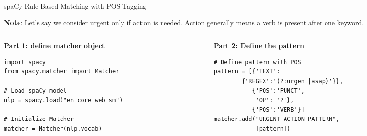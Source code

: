 \documentclass{beamer}
\begin{document}
\begin{frame}[fragile]{spaCy Rule-Based Matching with POS Tagging}

\textbf{Note}: Let's say we consider urgent only if action is needed. Action generally means a verb is present after one keyword.
\newline

\begin{columns}[T, totalwidth=\textwidth]

\begin{column}{0.475\textwidth}
\small
\textbf{Part 1: define matcher object}
\begin{tcolorbox}[colback=lightgray, colframe=lightgray,
                  boxsep=0mm, arc=1mm, boxrule=0mm,
                  left=1mm, right=1mm, top=1mm, bottom=1mm]
\begin{Verbatim}[fontsize=\scriptsize]
import spacy
from spacy.matcher import Matcher

# Load spaCy model
nlp = spacy.load("en_core_web_sm")

# Initialize Matcher
matcher = Matcher(nlp.vocab)
\end{Verbatim}
\end{tcolorbox}
\end{column}

\begin{column}{0.52\textwidth}
\small
\textbf{Part 2: Define the pattern}

\begin{tcolorbox}[colback=lightgray, colframe=lightgray,
                  boxsep=0mm, arc=1mm, boxrule=0mm,
                  left=1mm, right=5mm, top=1mm, bottom=1mm]
\begin{Verbatim}[fontsize=\scriptsize]# Define pattern with POS
pattern = [{'TEXT':
        {'REGEX':'(?:urgent|asap)'}},
           {'POS':'PUNCT',
            'OP': '?'},
           {'POS':'VERB'}]
matcher.add("URGENT_ACTION_PATTERN",
            [pattern])
\end{Verbatim}
\end{tcolorbox}
\end{column}

\end{columns}

\end{frame}
\end{document}
